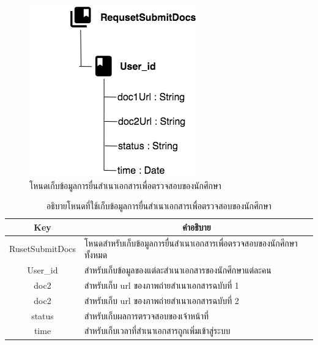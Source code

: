 \newpage
\begin{figure}[H]
	\centering
	\includegraphics[width=0.4\columnwidth]
	{Figures/3/DB/nodeReq}
	\caption{โหนดเก็บข้อมูลการยื่นสำเนาเอกสารเพื่อตรวจสอบของนักศึกษา}
	\label{Fig:DB4}
\end{figure}
\begin{table}[H]
	\centering
	\caption{อธิบายโหนดที่ใช้เก็บข้อมูลการยื่นสำเนาเอกสารเพื่อตรวจสอบของนักศึกษา}
	\label{my-label1}
	\begin{tabular}{|c|p{10cm}|}
		\hline
		\multicolumn{1}{|c|}{\textbf{Key}} & \multicolumn{1}{c|}{\textbf{คำอธิบาย}} \\ \hline
		RusetSubmitDocs & โหนดสำหรับเก็บข้อมูลการยื่นสำเนาเอกสารเพื่อตรวจสอบของนักศึกษาทั้งหมด \\ \hline
		User\_id & สำหรับเก็บข้อมูลของแต่ละสำเนาเอกสารของนักศึกษาแต่ละคน \\ \hline
		doc2 & สำหรับเก็บ url ของภาพถ่ายสำเนาเอกสารฉบับที่ 1\\ \hline
		doc2 & สำหรับเก็บ url ของภาพถ่ายสำเนาเอกสารฉบับที่ 2\\ \hline
		status & สำหรับเก็บผลการตรวจสอบของเจ้าหน้าที่ \\ \hline
		time & สำหรับเก็บเวลาที่สำเนาเอกสารถูกเพิ่มเข้าสู่ระบบ \\ \hline
	\end{tabular}
\end{table}

